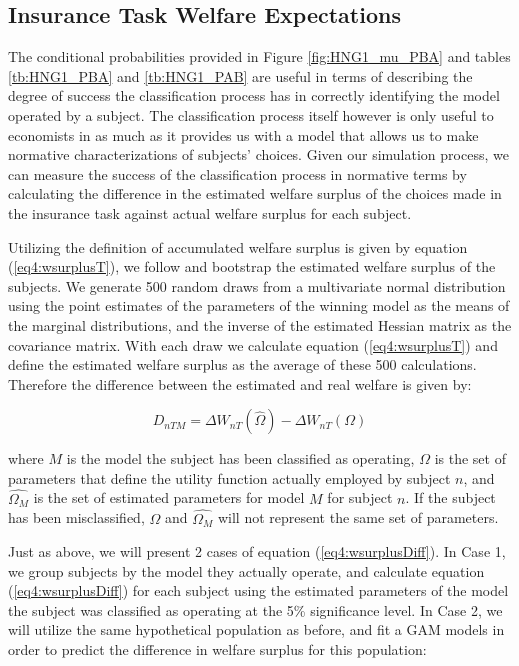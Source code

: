 \documentclass[../main.tex]{subfiles}
\begin{document}
\subsection{\texorpdfstring{\textcite{Harrison2016}}{Harrison and Ng (2016)} Insurance Task Welfare Expectations}

The conditional probabilities provided in Figure \ref{fig:HNG1_mu_PBA} and tables \ref{tb:HNG1_PBA} and \ref{tb:HNG1_PAB} are useful in terms of describing the degree of success the classification process has in correctly identifying the model operated by a subject.
The classification process itself however is only useful to economists in as much as it provides us with a model that allows us to make normative characterizations of subjects' choices.
Given our simulation process, we can measure the success of the classification process in normative terms by calculating the difference in the estimated welfare surplus of the choices made in the \textcite{Harrison2016} insurance task against actual welfare surplus for each subject.

Utilizing the definition of accumulated welfare surplus is given by equation (\ref{eq4:wsurplusT}), we follow \textcite[110-111]{Harrison2016} and bootstrap the estimated welfare surplus of the subjects.
We generate 500 random draws from a multivariate normal distribution using the point estimates of the parameters of the winning model as the means of the marginal distributions, and the inverse of the estimated Hessian matrix as the covariance matrix.
With each draw we calculate equation (\ref{eq4:wsurplusT}) and define the estimated welfare surplus as the average of these 500 calculations.
Therefore the difference between the estimated and real welfare is given by:

\begin{equation}
	\label{eq4:wsurplusDiff}
	D_{nTM} = \Delta W_{nT}(\hat{\Omega}) - \Delta W_{nT}(\Omega)
\end{equation}

\noindent where $M$ is the model the subject has been classified as operating, $\Omega$ is the set of parameters that define the utility function actually employed by subject $n$, and $\hat{\Omega_M}$ is the set of estimated parameters for model $M$ for subject $n$.
If the subject has been misclassified, $\Omega$ and $\hat{\Omega_M}$ will not represent the same set of parameters.

Just as above, we will present 2 cases of equation (\ref{eq4:wsurplusDiff}).
In Case 1, we group subjects by the model they actually operate, and calculate equation (\ref{eq4:wsurplusDiff}) for each subject using the estimated parameters of the model the subject was classified as operating at the 5\% significance level.
In Case 2, we will utilize the same hypothetical population as before, and fit a GAM models in order to predict the difference in welfare surplus for this population:
\end{document}
